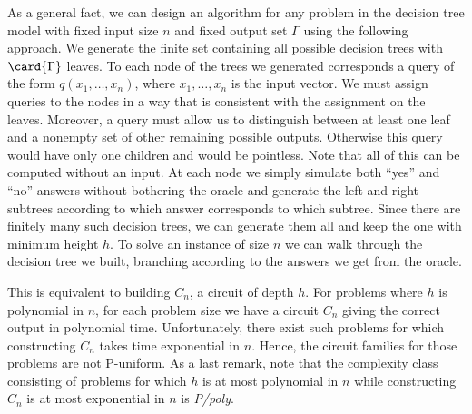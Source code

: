 As a general fact, we can design an algorithm for any problem in the decision
tree model with fixed input size \(n\) and fixed output set \(\Gamma\) using
the following approach. We generate the finite set containing all possible
decision trees with \(\card{\Gamma}\) leaves. To each node of the trees we
generated corresponds a query of the form \(q(x_1,\ldots,x_n)\), where
\(x_1,\ldots,x_n\) is the input vector. We must assign queries to the nodes
in a way that is consistent with the assignment on the leaves. Moreover, a
query must allow us to distinguish between at least one leaf and a nonempty
set of other remaining possible outputs. Otherwise this query would have only
one children and would be pointless. Note that all of this can be computed
without an input. At each node we simply simulate both ``yes'' and ``no''
answers without bothering the oracle and generate the left and right subtrees
according to which answer corresponds to which subtree. Since there are
finitely many such decision trees, we can generate them all and keep the one
with minimum height \(h\). To solve an instance of size \(n\) we can walk
through the decision tree we built, branching according to the answers we get
from the oracle.

This is equivalent to building \(C_n\), a circuit of depth \(h\). For problems
where \(h\) is polynomial in \(n\), for each problem size we have a circuit
\(C_n\) giving the correct output in polynomial time. Unfortunately, there
exist such problems for which constructing \(C_n\) takes time exponential
in \(n\). Hence, the circuit families for those problems are not P-uniform. As
a last remark, note that the complexity class consisting of problems for which
\(h\) is at most polynomial in \(n\) while constructing \(C_n\) is at most
exponential in \(n\) is \emph{P/poly}.

